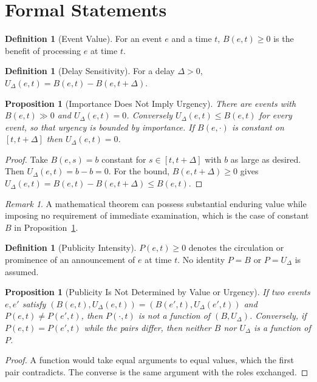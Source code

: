 \documentclass[11pt,letterpaper]{report}
\theoremstyle{plain}
\newtheorem{proposition}[theorem]{Proposition}
\theoremstyle{definition}
\newtheorem{definition}[theorem]{Definition}
\theoremstyle{remark}
\newtheorem{remark}[theorem]{Remark}
\begin{document}
\section{Formal Statements}

\begin{definition}[Event Value]\label{def:eventvalue}
For an event $e$ and a time $t$, $B(e,t)\ge0$ is the benefit of processing $e$ at time $t$.
\end{definition}

\begin{definition}[Delay Sensitivity]\label{def:delaysens}
For a delay $\Delta>0$, $U_\Delta(e,t)=B(e,t)-B(e,t+\Delta)$.
\end{definition}

\begin{proposition}[Importance Does Not Imply Urgency]\label{pr:impurg}
There are events with $B(e,t)\gg0$ and $U_\Delta(e,t)=0$. Conversely $U_\Delta(e,t)\le B(e,t)$ for every event, so that urgency is bounded by importance. If $B(e,\cdot)$ is constant on $[t,t+\Delta]$ then $U_\Delta(e,t)=0$.
\end{proposition}
\begin{proof}
Take $B(e,s)=b$ constant for $s\in[t,t+\Delta]$ with $b$ as large as desired. Then $U_\Delta(e,t)=b-b=0$. For the bound, $B(e,t+\Delta)\ge0$ gives $U_\Delta(e,t)=B(e,t)-B(e,t+\Delta)\le B(e,t)$.
\end{proof}

\begin{remark}
A mathematical theorem can possess substantial enduring value while imposing no requirement of immediate examination, which is the case of constant $B$ in Proposition~\ref{pr:impurg}.
\end{remark}

\begin{definition}[Publicity Intensity]\label{def:publicity}
$P(e,t)\ge0$ denotes the circulation or prominence of an announcement of $e$ at time $t$. No identity $P=B$ or $P=U_\Delta$ is assumed.
\end{definition}

\begin{proposition}[Publicity Is Not Determined by Value or Urgency]\label{pr:publicity}
If two events $e,e'$ satisfy $(B(e,t),U_\Delta(e,t))=(B(e',t),U_\Delta(e',t))$ and $P(e,t)\ne P(e',t)$, then $P(\cdot,t)$ is not a function of $(B,U_\Delta)$. Conversely, if $P(e,t)=P(e',t)$ while the pairs differ, then neither $B$ nor $U_\Delta$ is a function of $P$.
\end{proposition}
\begin{proof}
A function would take equal arguments to equal values, which the first pair contradicts. The converse is the same argument with the roles exchanged.
\end{proof}
\end{document}
